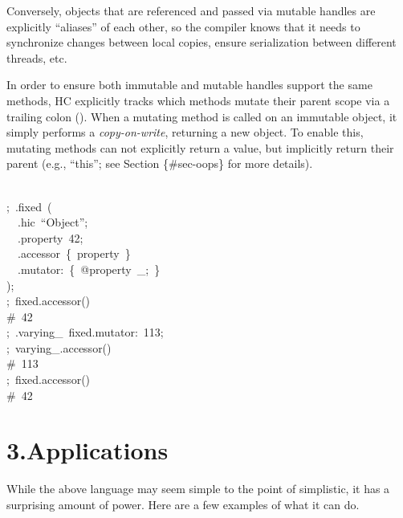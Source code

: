 \documentclass[preprint]{{acmart}}
\begin{document}
Conversely, objects that are referenced and passed via mutable handles
are explicitly \textquotedblleft{}aliases\textquotedblright{} of each other, so the compiler knows that it
needs to synchronize changes between local copies, ensure serialization
between different threads, etc.%

In order to ensure both immutable and mutable handles support the same
methods, HC explicitly tracks which methods mutate their parent scope via
a trailing colon (). When a mutating method is called on an immutable
object, it simply performs a \emph{copy-on-write}, returning a new object. To
enable this, mutating methods can not explicitly return a value, but 
implicitly return their parent (e.g., \textquotedblleft{}this\textquotedblright{}; see Section \{\#sec-oops\} for
more details).%
\begin{mdpre}%
\noindent\\
;~.fixed~(\\
~~.hic~“{Object}”;\\
~~.property~{42};\\
~~.accessor~\{~property~\}\\
~~.mutator{:}~\{~{@property}~\_;~\}\\
);\\
;~fixed.accessor()\\
{\#~42}\\
;~.varying\_~fixed.mutator{:}~{113};\\
;~varying\_.accessor()\\
{\#~113}\\
;~fixed.accessor()\\
{\#~42}%
\end{mdpre}
\section{3.\hspace*{0.5em}Applications}\label{sec-applications}%

\noindent{}While the above language may seem simple to the point of simplistic, it has a 
surprising amount of power.  Here are a few examples of what it can do.%
\end{document}
